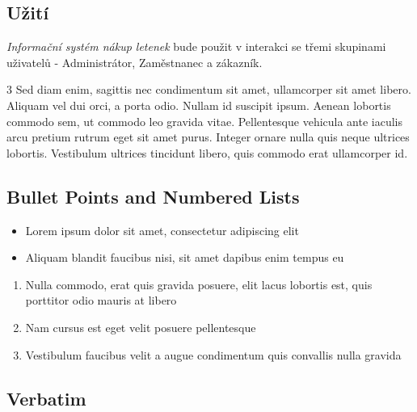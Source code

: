 \documentclass[
paper=128mm:96mm, %
fontsize=11pt, %
pagesize, %
parskip=half-, %
]{scrartcl} %
\newcommand*{\mygreen}[1]{\textcolor{mygreen}{#1}}
\newcommand*{\myblue}[1]{\textcolor{myblue}{#1}}
\newcommand*{\mybrown}[1]{\textcolor{mybrown}{#1}}
\newcommand*{\myred}[1]{\textcolor{myred}{#1}}
\theoremstyle{mythmstyle} %
\begin{document}
\clearpage


\subsection{Užití}

\textit{Informační systém nákup letenek} bude použit v interakci se třemi skupinami uživatelů - Administrátor, Zaměstnanec a zákazník. 

\begin{multicols}{3} %
\mygreen{Sed diam enim, sagittis nec} condimentum sit amet, ullamcorper sit amet libero. \mybrown{Aliquam vel dui orci}, a porta odio. \myred{Nullam id suscipit} ipsum. \myblue{Aenean lobortis} commodo sem, ut commodo leo gravida vitae. Pellentesque vehicula ante iaculis arcu pretium rutrum eget sit amet purus. Integer ornare nulla quis neque ultrices lobortis. Vestibulum ultrices tincidunt libero, quis commodo erat ullamcorper id.
\end{multicols}

\clearpage


\subsection{Bullet Points and Numbered Lists}

\begin{itemize}
\item Lorem ipsum dolor sit amet, consectetur adipiscing elit
\item Aliquam blandit faucibus nisi, sit amet dapibus enim tempus eu
\end{itemize}

\begin{enumerate}
\item Nulla commodo, erat quis gravida posuere, elit lacus lobortis est, quis porttitor odio mauris at libero
\item Nam cursus est eget velit posuere pellentesque
\item Vestibulum faucibus velit a augue condimentum quis convallis nulla gravida
\end{enumerate}

\clearpage


\subsection{Verbatim}
\end{document}
